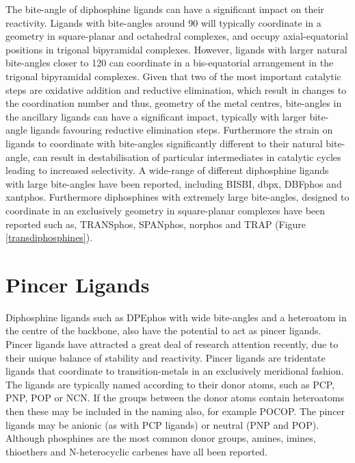 The bite-angle of diphosphine ligands can have a significant impact on their reactivity.  Ligands with bite-angles around 90\degrees{} will typically coordinate in a \cis{} geometry in square-planar and octahedral complexes, and occupy axial-equatorial positions in trigonal bipyramidal complexes.  However, ligands with larger natural bite-angles closer to 120\degrees{} can coordinate in a bis-equatorial arrangement in the trigonal bipyramidal complexes.  Given that two of the most important catalytic steps are oxidative addition and reductive elimination, which result in changes to the coordination number and thus, geometry of the metal centres, bite-angles in the ancillary ligands can have a significant impact, typically with larger bite-angle ligands favouring reductive elimination steps.  Furthermore the strain on ligands to coordinate with bite-angles significantly different to their natural bite-angle, can result in destabilisation of particular intermediates in catalytic cycles leading to increased selectivity.\cite{Freixa2003}  A wide-range of different diphosphine ligands with large bite-angles have been reported, including BISBI, dbpx, DBFphos and xantphos.  Furthermore diphosphines with extremely large bite-angles, designed to coordinate in an exclusively \trans{} geometry in square-planar complexes have been reported such as, TRANSphos, SPANphos, norphos and TRAP (Figure \ref{transdiphosphines}).



\section{Pincer Ligands}

Diphosphine ligands such as DPEphos with wide bite-angles and a heteroatom in the centre of the backbone, also have the potential to act as pincer ligands.  Pincer ligands have attracted a great deal of research attention recently, due to their unique balance of stability and reactivity.\cite{Becerra2009}  Pincer ligands are tridentate ligands that coordinate to transition-metals in an exclusively meridional fashion.   The ligands are typically named according to their donor atoms, such as PCP, PNP, POP or NCN.  If the groups between the donor atoms contain heteroatoms then these may be included in the naming also, for example POCOP.  The pincer ligands may be anionic (as with PCP ligands) or neutral (PNP and POP).\cite{Vlugt2009, Kataoka1995}  Although phosphines are the most common donor groups, amines,\cite{Singleton2003} imines,\cite{Takenaka2005} thioethers\cite{Zim2000} and N-heterocyclic carbenes\cite{Hahn2007} have all been reported.

